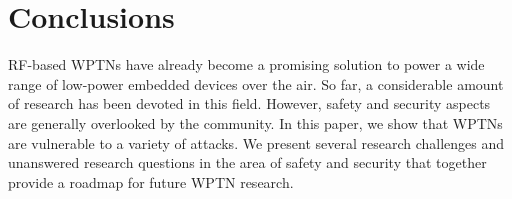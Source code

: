 \documentclass[journal,10pt,draftclsnofoot,onecolumn]{IEEEtran}
\begin{document}
\section{Conclusions}

RF-based WPTNs have already become a promising solution to power a wide range of low-power embedded devices over the air. So far, a considerable amount of research has been devoted in this field. However, safety and security aspects are generally overlooked by the community. In this paper, we show that WPTNs are vulnerable to a variety of attacks. We present several research challenges and unanswered research questions in the area of safety and security that together provide a roadmap for future WPTN research. 



\end{document}
